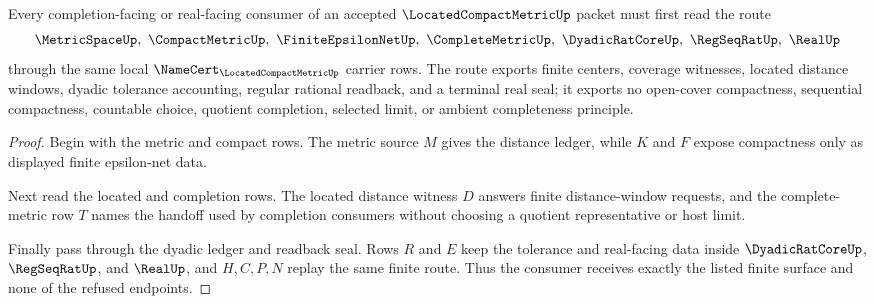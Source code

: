 \begin{theorem}
\label{thm:located-compact-metric-finite-net-completion-route}
Every completion-facing or real-facing consumer of an accepted $\LocatedCompactMetricUp$ packet must first read the route
$$
\MetricSpaceUp,\ \CompactMetricUp,\ \FiniteEpsilonNetUp,\ \CompleteMetricUp,\ \DyadicRatCoreUp,\ \RegSeqRatUp,\ \RealUp
$$
through the same local $\NameCert_{\LocatedCompactMetricUp}$ carrier rows. The route exports finite centers, coverage witnesses, located distance windows, dyadic tolerance accounting, regular rational readback, and a terminal real seal; it exports no open-cover compactness, sequential compactness, countable choice, quotient completion, selected limit, or ambient completeness principle.
\end{theorem}
\begin{proof}
Begin with the metric and compact rows. The metric source $M$ gives the distance ledger, while $K$ and $F$ expose compactness only as displayed finite epsilon-net data.

Next read the located and completion rows. The located distance witness $D$ answers finite distance-window requests, and the complete-metric row $T$ names the handoff used by completion consumers without choosing a quotient representative or host limit.

Finally pass through the dyadic ledger and readback seal. Rows $R$ and $E$ keep the tolerance and real-facing data inside $\DyadicRatCoreUp$, $\RegSeqRatUp$, and $\RealUp$, and $H,C,P,N$ replay the same finite route. Thus the consumer receives exactly the listed finite surface and none of the refused endpoints.
\end{proof}




